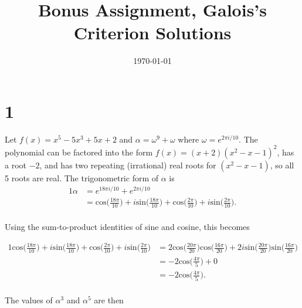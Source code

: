 \documentclass{article}
\title{\textbf{Bonus Assignment, Galois's Criterion Solutions}}
\date{}
\date\today
\begin{document}
\maketitle %

\thispagestyle{firstpage}

\section*{1}

Let $f(x) = x^5 - 5x^3 + 5x + 2$ and $\alpha = \omega^9 + \omega$ where $\omega = e^{2 \pi i/10}$. 
The polynomial can be factored into the form $f(x) = (x+2)(x^2 - x - 1)^2$, 
has a root $-2$, and has two repeating (irrational) real roots for $(x^2 - x - 1)$, 
so all 5 roots are real.  
The trigonometric form of $\alpha$ is 
\begin{alignat*}{1}
  \alpha &= e^{18 \pi i/10} + e^{2 \pi i/10} \\
  &= \mathrm{cos}\bigg( \frac{18 \pi}{10} \bigg) + i \mathrm{sin}\bigg( \frac{18 \pi}{10} \bigg) + 
  \mathrm{cos}\bigg( \frac{2 \pi}{10} \bigg) + i \mathrm{sin}\bigg( \frac{2 \pi}{10} \bigg).\\ 
\end{alignat*}

Using the sum-to-product identities of sine and cosine, this becomes 

\begin{alignat*}{1}
  \mathrm{cos}\bigg( \frac{18 \pi}{10} \bigg) + i \mathrm{sin}\bigg( \frac{18 \pi}{10} \bigg) + 
  \mathrm{cos}\bigg( \frac{2 \pi}{10} \bigg) + i \mathrm{sin}\bigg( \frac{2 \pi}{10} \bigg) 
  &= 2 \mathrm{cos}\bigg( \frac{20 \pi}{20} \bigg)\mathrm{cos}\bigg( \frac{16 \pi}{20} \bigg)
  + 2i \mathrm{sin}\bigg( \frac{20 \pi}{20} \bigg)\mathrm{sin}\bigg( \frac{16 \pi}{20} \bigg) \\
  &= -2 \mathrm{cos} \bigg( \frac{4 \pi}{5} \bigg) + 0 \\ 
  &= -2 \mathrm{cos} \bigg( \frac{4 \pi}{5} \bigg). \\ 
\end{alignat*}

The values of $\alpha ^3$ and $\alpha^5$ are then 
\end{document}
